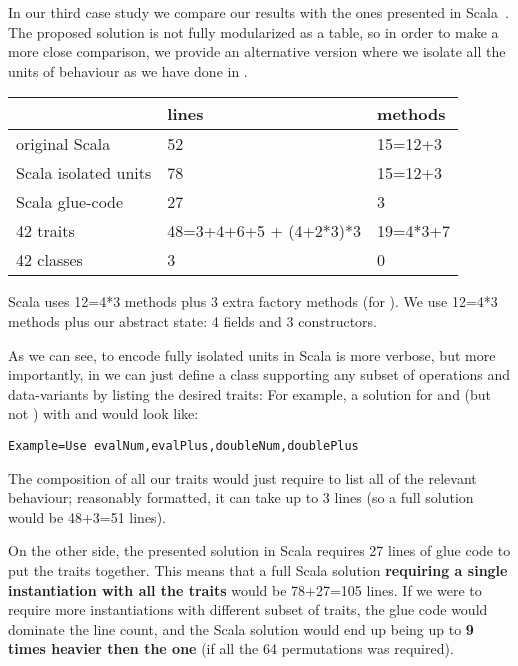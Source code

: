 In our third case study we compare our results with the ones presented
in Scala~\cite{Zenger-Odersky2005}.
The proposed solution is not fully modularized as a table,
so in order to make a more close comparison, we provide an alternative
version where we isolate all the units of behaviour as we
have done in \name.
\begin{minipage}{0.6\textwidth}
\begin{tabular}{l |l |l}
&                              lines  &   methods\\
\hline
original Scala~\cite{Zenger-Odersky2005}          & 52     &  15=12+3\\
Scala  isolated units   & 78    &  15=12+3\\
Scala  glue-code        & 27   &     3\\
42 traits               & 48=3+4+6+5 + (4+2*3)*3   &    19=4*3+7\\
42 classes              &   3    &     0\\
\end{tabular}
\end{minipage}
\begin{minipage}{0.4\textwidth}
Scala uses 12=4*3 methods plus 3 extra factory methods (for \Q@double@).
We use 12=4*3 methods plus our abstract state: 4 fields and 3 constructors.
\end{minipage}

As we can see, to encode fully isolated units in Scala is
more verbose,
but more importantly,
in \name we can just define a class supporting any subset of operations
and data-variants by listing the desired traits:
For example, a solution for \Q@Num@ and \Q@Plus@ (but not \Q@Neg@)
with \Q@eval@ and \Q@double@ would look like:
\begin{lstlisting}
Example=Use evalNum,evalPlus,doubleNum,doublePlus
\end{lstlisting}
The composition of all our traits would just require to list all
of the relevant behaviour; reasonably formatted, it can take up to 3 lines (so a full \name solution would be 48+3=51 lines).

On the other side, the presented solution in Scala requires
27 lines of glue code to put the traits together.
This means that a full Scala solution \textbf{requiring a single instantiation with all the traits} would be 78+27=105 lines.
If we were to require more instantiations with different subset of traits, the glue code would dominate the line count,
and the Scala solution would end up being up to \textbf{9 times heavier then the
\name one} (if all the 64 permutations was required).

